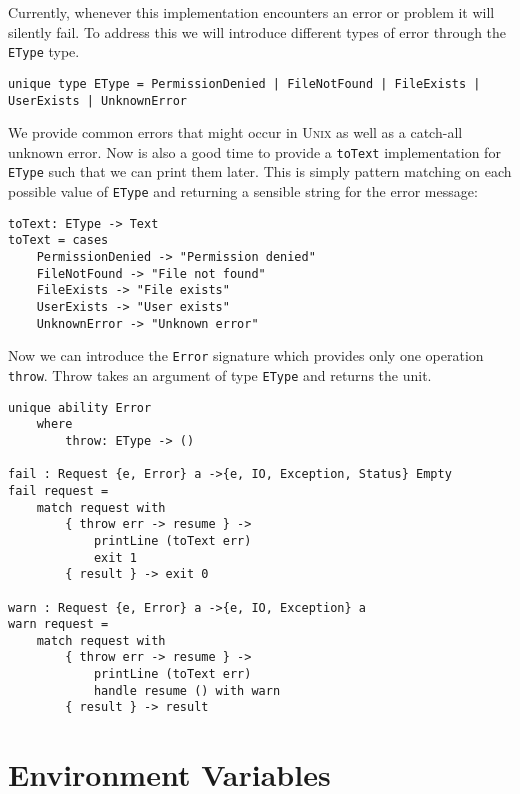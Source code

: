 \documentclass[logo,bsc,singlespacing,parskip]{infthesis}
\begin{document}
Currently, whenever this implementation encounters an error or problem it will
silently fail. To address this we will introduce different types of error
through the \texttt{EType} type.

\begin{lstlisting}[language=unison]
unique type EType = PermissionDenied | FileNotFound | FileExists | UserExists | UnknownError
\end{lstlisting}

We provide common errors that might occur in \textsc{Unix} as well as a
catch-all unknown error. Now is also a good time to provide a \texttt{toText}
implementation for \texttt{EType} such that we can print them later. This is 
simply pattern matching on each possible value of \texttt{EType} and returning a sensible string for the error message:

\begin{lstlisting}[language=unison]
toText: EType -> Text
toText = cases  
    PermissionDenied -> "Permission denied"
    FileNotFound -> "File not found"
    FileExists -> "File exists"
    UserExists -> "User exists"
    UnknownError -> "Unknown error"
\end{lstlisting}

Now we can introduce the \texttt{Error} signature which provides only one operation \texttt{throw}. Throw takes an argument of type \texttt{EType} and returns the unit.

\begin{lstlisting}[language=unison]
unique ability Error
    where
        throw: EType -> ()

fail : Request {e, Error} a ->{e, IO, Exception, Status} Empty
fail request =
    match request with
        { throw err -> resume } -> 
            printLine (toText err)
            exit 1
        { result } -> exit 0

warn : Request {e, Error} a ->{e, IO, Exception} a
warn request =
    match request with
        { throw err -> resume } -> 
            printLine (toText err)
            handle resume () with warn
        { result } -> result
\end{lstlisting}

\section{Environment Variables}
\end{document}
